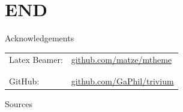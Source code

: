 \documentclass[10pt, compress]{beamer}
\begin{document}
\section{END}


\begin{frame}{Acknowledgements}
\begin{table}
\centering
\begin{tabular}{l l}
Latex Beamer: & \url{github.com/matze/mtheme}\\
& \\
& \\
GitHub: & \url{github.com/GaPhil/trivium}
\end{tabular}
\end{table}
\end{frame}

\begin{frame}{Sources}

\nocite{*}    
\end{frame}
\end{document}
